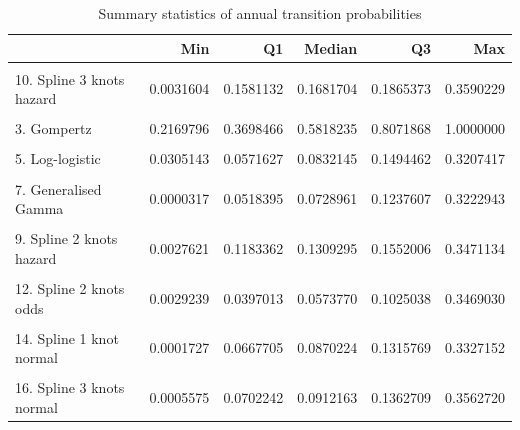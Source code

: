 \documentclass[
]{article}
\begin{document}
\begin{table}
\caption{\label{tab:validate_extrapolation3}Summary statistics of annual transition probabilities}
\begin{tabular}[t]{lrrrrr}
\toprule
  & Min & Q1 & Median & Q3 & Max\\
\midrule
\cellcolor{gray!6}{1. Exponential} & \cellcolor{gray!6}{0.2449482} & \cellcolor{gray!6}{0.2449482} & \cellcolor{gray!6}{0.2449482} & \cellcolor{gray!6}{0.2449482} & \cellcolor{gray!6}{0.2449482}\\
10. Spline 3 knots hazard & 0.0031604 & 0.1581132 & 0.1681704 & 0.1865373 & 0.3590229\\
\cellcolor{gray!6}{2. Weibull} & \cellcolor{gray!6}{0.0907442} & \cellcolor{gray!6}{0.4105709} & \cellcolor{gray!6}{0.4790585} & \cellcolor{gray!6}{0.5216195} & \cellcolor{gray!6}{0.5525972}\\
3. Gompertz & 0.2169796 & 0.3698466 & 0.5818235 & 0.8071868 & 1.0000000\\
\cellcolor{gray!6}{4. Log-normal} & \cellcolor{gray!6}{0.0022958} & \cellcolor{gray!6}{0.1000774} & \cellcolor{gray!6}{0.1279068} & \cellcolor{gray!6}{0.1841659} & \cellcolor{gray!6}{0.3070152}\\
5. Log-logistic & 0.0305143 & 0.0571627 & 0.0832145 & 0.1494462 & 0.3207417\\
\cellcolor{gray!6}{6. Gamma} & \cellcolor{gray!6}{0.0471845} & \cellcolor{gray!6}{0.3701940} & \cellcolor{gray!6}{0.3852535} & \cellcolor{gray!6}{0.3907371} & \cellcolor{gray!6}{0.3935697}\\
7. Generalised Gamma & 0.0000317 & 0.0518395 & 0.0728961 & 0.1237607 & 0.3222943\\
\cellcolor{gray!6}{8. Spline 1 knot hazard} & \cellcolor{gray!6}{0.0048605} & \cellcolor{gray!6}{0.0929348} & \cellcolor{gray!6}{0.1060806} & \cellcolor{gray!6}{0.1322263} & \cellcolor{gray!6}{0.3462113}\\
9. Spline 2 knots hazard & 0.0027621 & 0.1183362 & 0.1309295 & 0.1552006 & 0.3471134\\
\cellcolor{gray!6}{11. Spline 1 knot odds} & \cellcolor{gray!6}{0.0040186} & \cellcolor{gray!6}{0.0370407} & \cellcolor{gray!6}{0.0534928} & \cellcolor{gray!6}{0.0956147} & \cellcolor{gray!6}{0.3493116}\\
12. Spline 2 knots odds & 0.0029239 & 0.0397013 & 0.0573770 & 0.1025038 & 0.3469030\\
\cellcolor{gray!6}{13. Spline 3 knots odds} & \cellcolor{gray!6}{0.0031346} & \cellcolor{gray!6}{0.0443526} & \cellcolor{gray!6}{0.0641665} & \cellcolor{gray!6}{0.1145082} & \cellcolor{gray!6}{0.3547245}\\
14. Spline 1 knot normal & 0.0001727 & 0.0667705 & 0.0870224 & 0.1315769 & 0.3327152\\
\cellcolor{gray!6}{15. Spline 2 knots normal} & \cellcolor{gray!6}{0.0003302} & \cellcolor{gray!6}{0.0575542} & \cellcolor{gray!6}{0.0758377} & \cellcolor{gray!6}{0.1164719} & \cellcolor{gray!6}{0.3361441}\\
16. Spline 3 knots normal & 0.0005575 & 0.0702242 & 0.0912163 & 0.1362709 & 0.3562720\\
\bottomrule
\end{tabular}
\end{table}
\end{document}
